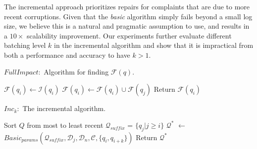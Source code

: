 The incremental approach prioritizes repairs for complaints that are due to more recent corruptions.
Given that the \emph{basic} algorithm simply fails beyond a small log size, we believe this is a natural and pragmatic assumption to use, and results in 
a $10\times$ scalability improvement.
Our experiments further evaluate different batching level $k$ in the incremental algorithm and show that it is impractical from both a performance and accuracy to have $k > 1$.

\begin{algorithm}[t]
\scriptsize
\caption{$FullImpact:$ Algorithm for finding $\mathcal{F}(q)$.}
\label{alg:fullimpact}
\begin{algorithmic}[2]
\STATE $\mathcal{F}(q_i) \leftarrow \mathcal{I}(q_i)$
\STATE $\mathcal{F}(q_i) \leftarrow \mathcal{F}(q_i) \cup \mathcal{F}(q_j)$
\ENDIF
\ENDFOR
\STATE Return $\mathcal{F}(q_i)$
\end{algorithmic}
\end{algorithm}

\begin{algorithm}[t]
\caption{$Inc_k:$ The incremental algorithm. 
}
\scriptsize
\label{alg:incalg}
\begin{algorithmic}[2]
\STATE Sort $Q$ from most to least recent
  \STATE $\mathcal{Q}_{suffix}$ = $\{q_j | j \ge i \}$ 
  \STATE $\mathcal{Q}^*$ $\leftarrow$ $Basic_{params}(\mathcal{Q}_{suffix}, \mathcal{D}_j, \mathcal{D}_n, \mathcal{C}, \{q_i, q_{i+k}\})$
    \STATE Return $\mathcal{Q}^*$
  \ENDIF
\ENDFOR
\end{algorithmic}
\end{algorithm}




